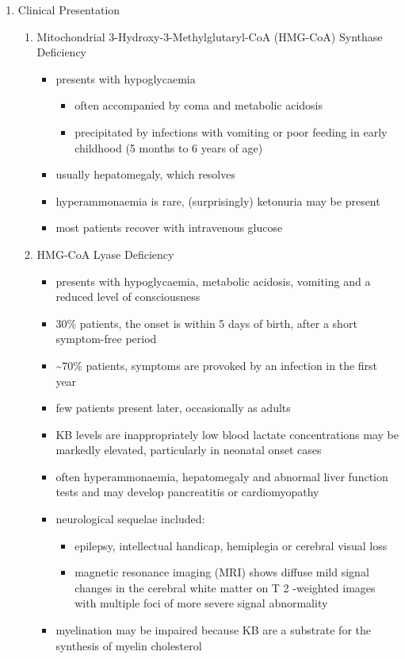 \documentclass{scrartcl}
\begin{document}
\begin{enumerate}
\item Clinical Presentation
\label{sec:org2838f16}
\begin{enumerate}
\item Mitochondrial 3-Hydroxy-3-Methylglutaryl-CoA (HMG-CoA) Synthase Deficiency
\label{sec:org12d6f75}
\begin{itemize}
\item presents with hypoglycaemia
\begin{itemize}
\item often accompanied by coma and metabolic acidosis
\item precipitated by infections with vomiting or poor feeding in early
childhood (5 months to 6 years of age)
\end{itemize}
\item usually hepatomegaly, which resolves
\item hyperammonaemia is rare, (surprisingly) ketonuria may be present
\item most patients recover with intravenous glucose
\end{itemize}

\item HMG-CoA Lyase Deficiency
\label{sec:org2993f6d}
\begin{itemize}
\item presents with hypoglycaemia, metabolic acidosis, vomiting and a
reduced level of consciousness
\item 30\% patients, the onset is within 5 days of birth, after a short symptom-free period
\item \textasciitilde{}70\% patients, symptoms are provoked by an infection in the first year
\item few patients present later, occasionally as adults
\item KB levels are inappropriately low blood lactate concentrations
may be markedly elevated, particularly in neonatal onset cases
\item often hyperammonaemia, hepatomegaly and abnormal liver function tests and
may develop pancreatitis or cardiomyopathy
\item neurological sequelae included:
\begin{itemize}
\item epilepsy, intellectual handicap, hemiplegia or cerebral visual loss
\item magnetic resonance imaging (MRI) shows diffuse mild signal changes
in the cerebral white matter on T 2 -weighted images with multiple
foci of more severe signal abnormality
\end{itemize}
\item myelination may be impaired because KB are a substrate for the
synthesis of myelin cholesterol
\end{itemize}
\end{enumerate}


\end{enumerate}
\end{document}

